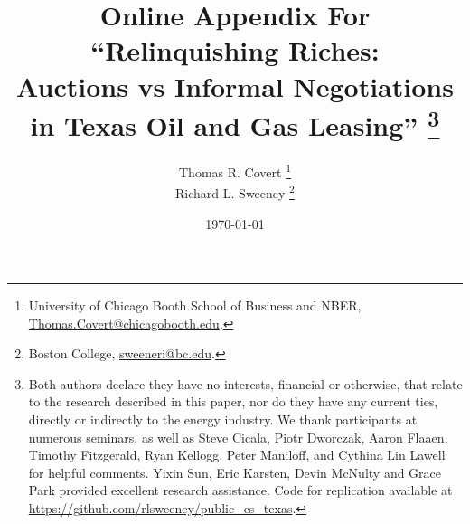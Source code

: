\documentclass[12pt]{article}
\begin{document}
\title{Online Appendix For \\ ``Relinquishing Riches: \\ Auctions vs Informal Negotiations \\ in Texas Oil and Gas Leasing''
\thanks{Both authors declare they have no interests, financial or otherwise, that relate to the research described in this paper, nor do they have any current ties, directly or indirectly to the energy industry. We thank participants at numerous seminars, as well as Steve Cicala, Piotr Dworczak, Aaron Flaaen, Timothy Fitzgerald, Ryan Kellogg, Peter Maniloff, and Cythina Lin Lawell for helpful comments.  Yixin Sun, Eric Karsten, Devin McNulty and Grace Park provided excellent research assistance. Code for replication available at \href{https://github.com/rlsweeney/public_cs_texas}{https://github.com/rlsweeney/public\_cs\_texas}.}
\vspace{10pt}}

\author{Thomas R. Covert \thanks{University of Chicago Booth School of Business and NBER, \protect\href{mailto:Thomas.Covert@chicagobooth.edu}{Thomas.Covert@chicagobooth.edu}.}
\\
 Richard L. Sweeney \thanks{Boston College, \protect\href{mailto:sweeneri@bc.edu}{sweeneri@bc.edu}.}}

\date{\today \\
 \vspace{0.5cm}
}
\maketitle

\setcounter{page}{1} \onehalfspace




\end{document}
